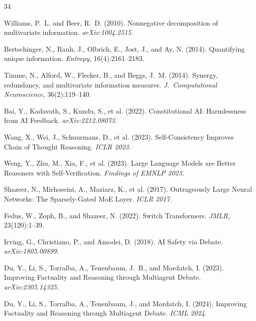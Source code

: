 \documentclass[11pt,a4paper]{article}
\theoremstyle{definition}
\begin{document}
\begin{thebibliography}{34}

Williams, P.~L. and Beer, R.~D. (2010).
\newblock Nonnegative decomposition of multivariate information.
\newblock \emph{arXiv:1004.2515}.

Bertschinger, N., Rauh, J., Olbrich, E., Jost, J., and Ay, N. (2014).
\newblock Quantifying unique information.
\newblock \emph{Entropy}, 16(4):2161--2183.

Timme, N., Alford, W., Flecker, B., and Beggs, J.~M. (2014).
\newblock Synergy, redundancy, and multivariate information measures.
\newblock \emph{J.\ Computational Neuroscience}, 36(2):119--140.

Bai, Y., Kadavath, S., Kundu, S., et al. (2022).
\newblock Constitutional AI: Harmlessness from AI Feedback.
\newblock \emph{arXiv:2212.08073}.

Wang, X., Wei, J., Schuurmans, D., et al. (2023).
\newblock Self-Consistency Improves Chain of Thought Reasoning.
\newblock \emph{ICLR 2023}.

Weng, Y., Zhu, M., Xia, F., et al. (2023).
\newblock Large Language Models are Better Reasoners with Self-Verification.
\newblock \emph{Findings of EMNLP 2023}.

Shazeer, N., Mirhoseini, A., Maziarz, K., et al. (2017).
\newblock Outrageously Large Neural Networks: The Sparsely-Gated MoE Layer.
\newblock \emph{ICLR 2017}.

Fedus, W., Zoph, B., and Shazeer, N. (2022).
\newblock Switch Transformers.
\newblock \emph{JMLR}, 23(120):1--39.

Irving, G., Christiano, P., and Amodei, D. (2018).
\newblock AI Safety via Debate.
\newblock \emph{arXiv:1805.00899}.

Du, Y., Li, S., Torralba, A., Tenenbaum, J.~B., and Mordatch, I. (2023).
\newblock Improving Factuality and Reasoning through Multiagent Debate.
\newblock \emph{arXiv:2305.14325}.

Du, Y., Li, S., Torralba, A., Tenenbaum, J., and Mordatch, I. (2024).
\newblock Improving Factuality and Reasoning through Multiagent Debate.
\newblock \emph{ICML 2024}.


\end{thebibliography}
\end{document}
